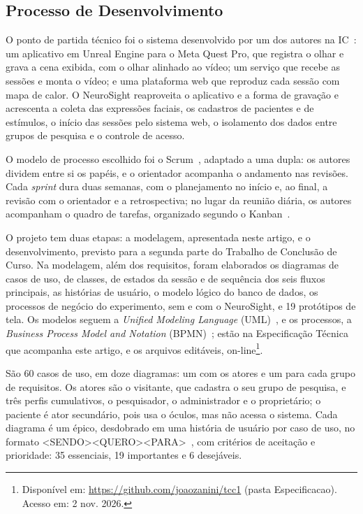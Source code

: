\documentclass[conference,a4paper,10pt]{IEEEtran}
\begin{document}
\subsection{Processo de Desenvolvimento}

O ponto de partida técnico foi o sistema desenvolvido por um dos autores na IC~\cite{IC}: um aplicativo em Unreal Engine para o Meta Quest Pro, que registra o olhar e grava a cena exibida, com o olhar alinhado ao vídeo; um serviço que recebe as sessões e monta o vídeo; e uma plataforma web que reproduz cada sessão com mapa de calor. O NeuroSight reaproveita o aplicativo e a forma de gravação e acrescenta a coleta das expressões faciais, os cadastros de pacientes e de estímulos, o início das sessões pelo sistema web, o isolamento dos dados entre grupos de pesquisa e o controle de acesso.

O modelo de processo escolhido foi o Scrum~\cite{SCRUM}, adaptado a uma dupla: os autores dividem entre si os papéis, e o orientador acompanha o andamento nas revisões. Cada \textit{sprint} dura duas semanas, com o planejamento no início e, ao final, a revisão com o orientador e a retrospectiva; no lugar da reunião diária, os autores acompanham o quadro de tarefas, organizado segundo o Kanban~\cite{KANBAN}.

O projeto tem duas etapas: a modelagem, apresentada neste artigo, e o desenvolvimento, previsto para a segunda parte do Trabalho de Conclusão de Curso. Na modelagem, além dos requisitos, foram elaborados os diagramas de casos de uso, de classes, de estados da sessão e de sequência dos seis fluxos principais, as histórias de usuário, o modelo lógico do banco de dados, os processos de negócio do experimento, sem e com o NeuroSight, e 19 protótipos de tela. Os modelos seguem a \textit{Unified Modeling Language} (UML)~\cite{UML}, e os processos, a \textit{Business Process Model and Notation} (BPMN)~\cite{BPMN}; estão na Especificação Técnica que acompanha este artigo, e os arquivos editáveis, on-line\footnote{Disponível em: \url{https://github.com/joaozanini/tcc1} (pasta Especificacao). Acesso em: 2 nov. 2026.}.

São 60 casos de uso, em doze diagramas: um com os atores e um para cada grupo de requisitos. Os atores são o visitante, que cadastra o seu grupo de pesquisa, e três perfis cumulativos, o pesquisador, o administrador e o proprietário; o paciente é ator secundário, pois usa o óculos, mas não acessa o sistema. Cada diagrama é um épico, desdobrado em uma história de usuário por caso de uso, no formato <SENDO><QUERO><PARA>~\cite{COHN}, com critérios de aceitação e prioridade: 35 essenciais, 19 importantes e 6 desejáveis.
\end{document}
